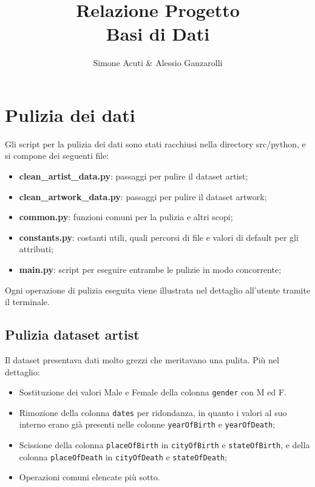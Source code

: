 \documentclass{ol-softwaremanual}
\title{Relazione Progetto \\Basi di Dati}
\author{Simone Acuti \& Alessio Ganzarolli}
\begin{document}
\maketitle

\tableofcontents
\newpage

\section{Pulizia dei dati}

Gli script per la pulizia dei dati sono stati racchiusi nella directory src/python, e si compone dei seguenti file:
\begin{itemize}
    \item \textbf{clean\_artist\_data.py}: passaggi per pulire il dataset artist;
    \item \textbf{clean\_artwork\_data.py}: passaggi per pulire il dataset artwork;
    \item \textbf{common.py}: funzioni comuni per la pulizia e altri scopi;
    \item \textbf{constants.py}: costanti utili, quali percorsi di file e valori di default per gli attributi;
    \item \textbf{main.py}: script per eseguire entrambe le pulizie in modo concorrente;
\end{itemize}
Ogni operazione di pulizia eseguita viene illustrata nel dettaglio all’utente tramite il terminale.

\subsection{Pulizia dataset artist}
Il dataset presentava dati molto grezzi che meritavano una pulita. Più nel dettaglio:
\begin{itemize}
    \item Sostituzione dei valori Male e Female della colonna \verb|gender| con M ed F.
    \item Rimozione della colonna \verb|dates| per ridondanza, in quanto i valori al suo interno erano già presenti 
    nelle colonne \verb|yearOfBirth| e \verb|yearOfDeath|;
    \item Scissione della colonna \verb|placeOfBirth| in \verb|cityOfBirth| e \verb|stateOfBirth|, e della colonna \verb|placeOfDeath| in 
    \verb|cityOfDeath| e \verb|stateOfDeath|;
    \item Operazioni comuni elencate più sotto.
\end{itemize}
\end{document}
